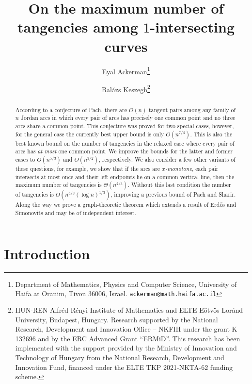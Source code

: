 \documentclass[11pt]{article}
\theoremstyle{definition}
\begin{document}
\title{On the maximum number of tangencies among $1$-intersecting curves}

	\author{
	Eyal Ackerman\thanks{Department of Mathematics, Physics and Computer Science,
		University of Haifa at Oranim, 	Tivon 36006, Israel. \texttt{ackerman@math.haifa.ac.il}}\and
	Bal\'azs Keszegh\thanks{HUN-REN Alfréd Rényi Institute of Mathematics and ELTE Eötvös Loránd University, Budapest, Hungary. 
		Research supported by the National Research, Development and Innovation Office -- NKFIH under the grant K 132696 and by the ERC Advanced Grant ``ERMiD''. This research has been implemented with the support provided by the Ministry of Innovation and Technology of Hungary from the National Research, Development and Innovation Fund, financed under the  ELTE TKP 2021-NKTA-62 funding scheme.}
}
\maketitle

\begin{abstract}
According to a conjecture of Pach, there are $O(n)$ tangent pairs among any family of $n$ Jordan arcs in which every pair of arcs has precisely one common point and no three arcs share a common point.
This conjecture was proved for two special cases, however, for the general case the currently best upper bound is only $O(n^{7/4})$. This is also the best known bound on the number of tangencies in the relaxed case where every pair of arcs has \emph{at most} one common point.
We improve the bounds for the latter and former cases to $O(n^{5/3})$ and $O(n^{3/2})$, respectively.
We also consider a few other variants of these questions, for example, we show that if the arcs are \emph{$x$-monotone}, each pair intersects at most once and their left endpoints lie on a common vertical line, then the maximum number of tangencies is $\Theta(n^{4/3})$.
Without this last condition the number of tangencies is $O(n^{4/3}(\log n)^{1/3})$,  improving a previous bound of Pach and Sharir.
Along the way we prove a graph-theoretic theorem which extends a result of Erd\H{o}s and Simonovits and may be of independent interest.
\end{abstract}



\section{Introduction}
\end{document}
